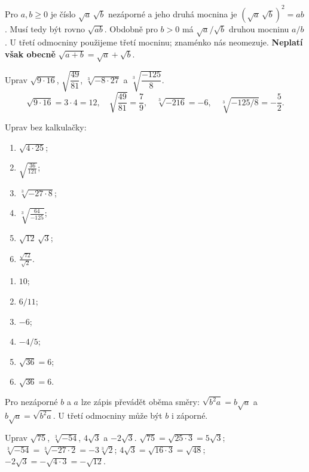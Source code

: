\documentclass[11pt,a4paper]{article}
\begin{document}
Pro $a,b\ge0$ je číslo $\sqrt a\,\sqrt b$ nezáporné a jeho druhá mocnina je
$(\sqrt a\,\sqrt b)^2=ab$. Musí tedy být rovno $\sqrt{ab}$.
Obdobně pro $b>0$ má $\sqrt a/\sqrt b$ druhou mocninu $a/b$.
U třetí odmocniny použijeme třetí mocninu; znaménko nás neomezuje.
\textbf{Neplatí však obecně} $\sqrt{a+b}=\sqrt a+\sqrt b$.

\begin{prikladReseniBox}[title={Příklad 1},breakable=false]
Uprav $\sqrt{9\cdot 16}$, $\sqrt{\dfrac{49}{81}}$, $\sqrt[3]{-8\cdot27}$ a
$\sqrt[3]{\dfrac{-125}{8}}$.
\tcblower
\[
\sqrt{9\cdot16}=3\cdot4=12,\quad
\sqrt{\frac{49}{81}}=\frac79,\quad
\sqrt[3]{-216}=-6,\quad \sqrt[3]{-125/8}=-\frac52.
\]
\end{prikladReseniBox}

\begin{zadaniReseniBox}[title={Samostatná práce 1},breakable=false]
Uprav bez kalkulačky:
\begin{enumerate}[label=\alph*)]
\item $\sqrt{4\cdot 25}$; \item $\sqrt{\frac{36}{121}}$;
\item $\sqrt[3]{-27\cdot8}$; \item $\sqrt[3]{\frac{64}{-125}}$;
\item $\sqrt{12}\,\sqrt3$; \item $\frac{\sqrt{72}}{\sqrt2}$.
\end{enumerate}
\tcblower
\begin{enumerate}[label=\alph*)]
\item $10$; \item $6/11$; \item $-6$; \item $-4/5$;
\item $\sqrt{36}=6$; \item $\sqrt{36}=6$.
\end{enumerate}
\end{zadaniReseniBox}

Pro nezáporné $b$ a $a$ lze zápis převádět oběma směry:
$\sqrt{b^2a}=b\sqrt a$ a $b\sqrt a=\sqrt{b^2a}$.
U třetí odmocniny může být $b$ i záporné.

\begin{prikladReseniBox}[title={Příklad 2},breakable=false]
Uprav $\sqrt{75}$, $\sqrt[3]{-54}$, $4\sqrt3$ a $-2\sqrt3$.
\tcblower
$\sqrt{75}=\sqrt{25\cdot3}=5\sqrt3$; 
$\sqrt[3]{-54}=\sqrt[3]{-27\cdot2}=-3\sqrt[3]2$;
$4\sqrt3=\sqrt{16\cdot3}=\sqrt{48}$;
$-2\sqrt3=-\sqrt{4\cdot3}=-\sqrt{12}$.
\end{prikladReseniBox}
\end{document}
